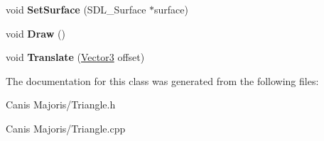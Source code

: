 \begin{DoxyCompactItemize}
\item 
\hypertarget{class_core_1_1_renderer_1_1_core_utils_1_1_triangle_a0aed31329b241ce19992b84af27a69f1}{void {\bfseries Set\+Surface} (S\+D\+L\+\_\+\+Surface $\ast$surface)}\label{class_core_1_1_renderer_1_1_core_utils_1_1_triangle_a0aed31329b241ce19992b84af27a69f1}

\item 
\hypertarget{class_core_1_1_renderer_1_1_core_utils_1_1_triangle_a04ae32a7d8a133afa267d7f8936e1da3}{void {\bfseries Draw} ()}\label{class_core_1_1_renderer_1_1_core_utils_1_1_triangle_a04ae32a7d8a133afa267d7f8936e1da3}

\item 
\hypertarget{class_core_1_1_renderer_1_1_core_utils_1_1_triangle_a5e9c9dc207c81a76bcab74cf8748ef14}{void {\bfseries Translate} (\hyperlink{class_vector3}{Vector3} offset)}\label{class_core_1_1_renderer_1_1_core_utils_1_1_triangle_a5e9c9dc207c81a76bcab74cf8748ef14}

\end{DoxyCompactItemize}


The documentation for this class was generated from the following files\+:\begin{DoxyCompactItemize}
\item 
Canis Majoris/Triangle.\+h\item 
Canis Majoris/Triangle.\+cpp\end{DoxyCompactItemize}
